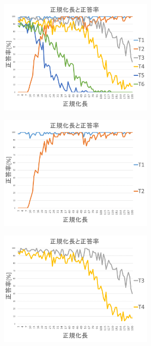 \begin{figure}[h]
	\centering
	\begin{minipage}[t]{.49\textwidth}
		\centering
		\includegraphics[width=7.5cm]{chart11_a.png} \\ %
		\label{subfigure:unit_a}    
	\end{minipage}
	\begin{minipage}[t]{.49\textwidth}
		\centering
		\includegraphics[width=7.5cm]{chart11_b.png} \\ %
		\label{subfigure:unit_b}
	\end{minipage}
	\begin{minipage}[t]{.49\textwidth}
		\centering
		\includegraphics[width=7.5cm]{chart11_c.png} \\ %

\end{minipage}
\end{figure}
